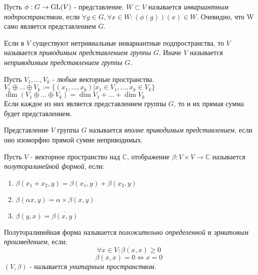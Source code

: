 \begin{defi}
Пусть $\phi:G\to\operatorname{GL}(V)$ - представление. $W\subset V$ называется \textit{инвариантным подпространством}, если $\forall g\in G,\forall x\in W: (\phi(g))(x)\in W$. Очевидно, что W само является представлением $G$.
\end{defi}

\begin{defi}
Если в $V$ существуют нетривиальные инвариантные подпространства, то $V$ называется \textit{приводимым представлением группы $G$}. Иначе $V$ называется \textit{неприводимым представлением группы $G$}.
\end{defi}

\begin{ass}
Пусть $V_1,\ldots,V_k$ - любые векторные пространства.\\
$V_1\oplus\ldots\oplus V_k:=\{(x_1,\ldots,x_k)|x_1\in V_1,\ldots,x_k\in V_k\}$\\
$\dim(V_1\oplus\ldots\oplus V_k) = \dim V_1+\ldots+\dim V_k$\\
Если каждое из них является представлением группы $G$, то и их прямая сумма будет представлением.
\end{ass}

\begin{defi}
Представление $V$ группы $G$ называется \textit{вполне приводимым представлением}, если оно изоморфно прямой сумме неприводимых.
\end{defi}

\begin{defi}
Пусть $V$ - векторное пространство над $\mathbb{C}$, отображение $\beta:V\times V\to \mathbb{C}$ называется \textit{полуторалинейной формой}, если:
\begin{enumerate}
  \item $\beta(x_1 + x_2,y) = \beta(x_1,y) + \beta(x_2,y)$
  \item $\beta(\alpha x,y) = \alpha\times\beta(x,y)$
  \item $\beta(y,x) = \overline{\beta(x,y)}$
\end{enumerate}
\end{defi}

\begin{defi}
Полуторалинейная форма называется \textit{положительно определенной} и \textit{эрмитовым произведением}, если: 
$$\forall x\in V:\beta(x,x)\geq 0$$
$$\beta(x,x)=0\Leftrightarrow x=0$$
$(V,\beta)$ - называется \textit{унитарным пространством}.
\end{defi}

